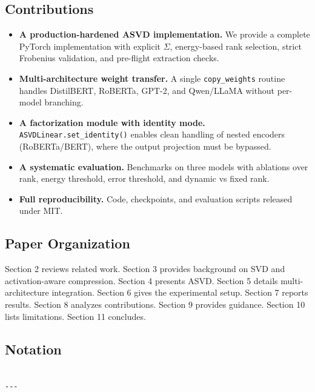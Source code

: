 \subsection{Contributions}

\begin{itemize}
\item \textbf{A production-hardened ASVD implementation.} We provide a complete
  PyTorch implementation with explicit $\Sigma$, energy-based rank selection,
  strict Frobenius validation, and pre-flight extraction checks.
\item \textbf{Multi-architecture weight transfer.} A single \texttt{copy\_weights} routine
  handles DistilBERT, RoBERTa, GPT-2, and Qwen/LLaMA without per-model
  branching.
\item \textbf{A factorization module with identity mode.} \texttt{ASVDLinear.set\_identity()}
  enables clean handling of nested encoders (RoBERTa/BERT), where the output
  projection must be bypassed.
\item \textbf{A systematic evaluation.} Benchmarks on three models with ablations
  over rank, energy threshold, error threshold, and dynamic vs fixed rank.
\item \textbf{Full reproducibility.} Code, checkpoints, and evaluation scripts
  released under MIT.

\end{itemize}
\subsection{Paper Organization}

Section 2 reviews related work. Section 3 provides background on SVD and 
activation-aware compression. Section 4 presents ASVD. Section 5 details 
multi-architecture integration. Section 6 gives the experimental setup. 
Section 7 reports results. Section 8 analyzes contributions. Section 9 
provides guidance. Section 10 lists limitations. Section 11 concludes.



\subsection{Notation}

\begin{lstlisting}

---
\end{lstlisting}